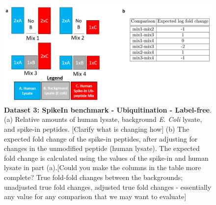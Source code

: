 \documentclass[mcp]{article}
\numberwithin{table}{section}
\def\todo#1{{\color{red}[#1]}}
\begin{document}
\begin{figure}[ht]
\centering
\includegraphics[scale=.4]{images/benchmark_fig.png}
\caption{{\bf Dataset 3: SpikeIn benchmark - Ubiquitination - Label-free}. (a) Relative amounts of human lysate, background {\it E. Coli} lysate, and spike-in peptides. \todo{Clarify what is changing how} (b) The expected fold change of the spike-in peptides, after adjusting for changes in the unmodified peptide (human lysate). The expected fold change is calculated using the values of the spike-in and human lysate in part (a).\todo{Could you make the columns in the table more complete? True fold-fold changes between the backgrounds; unadjusted true fold changes, adjusted true fold changes - essentially any value for any comparison that we may want to evaluate}}

\label{fig:benchmark-design}
\end{figure}
\end{document}
